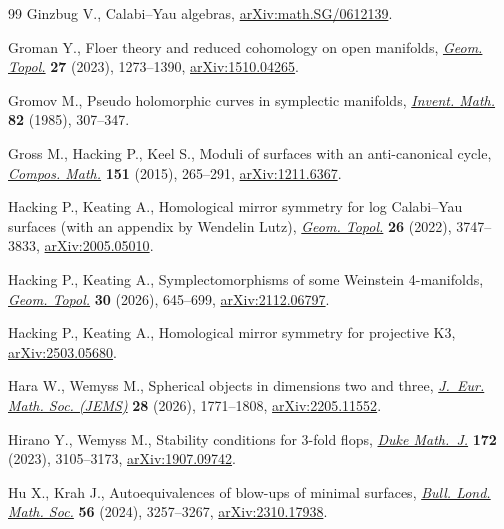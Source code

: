 \documentclass[pdftex]{sigma}
\theoremstyle{definition}
\numberwithin{equation}{section}
\begin{document}
\begin{thebibliography}{99}
Ginzbug V., Calabi--{Y}au algebras,
 \href{http://arxiv.org/abs/math.SG/0612139}{arXiv:math.SG/0612139}.

Groman Y., Floer theory and reduced cohomology on open manifolds,
 \href{https://doi.org/10.2140/gt.2023.27.1273}{\textit{Geom. Topol.}}
 \textbf{27} (2023), 1273--1390,
 \href{http://arxiv.org/abs/1510.04265}{arXiv:1510.04265}.

Gromov M., Pseudo holomorphic curves in symplectic manifolds,
 \href{https://doi.org/10.1007/BF01388806}{\textit{Invent. Math.}} \textbf{82}
 (1985), 307--347.

Gross M., Hacking P., Keel S., Moduli of surfaces with an anti-canonical cycle,
 \href{https://doi.org/10.1112/S0010437X14007611}{\textit{Compos. Math.}}
 \textbf{151} (2015), 265--291,
 \href{http://arxiv.org/abs/1211.6367}{arXiv:1211.6367}.

Hacking P., Keating A., Homological mirror symmetry for log {C}alabi--{Y}au
 surfaces (with an appendix by {W}endelin {L}utz),
 \href{https://doi.org/10.2140/gt.2022.26.3747}{\textit{Geom. Topol.}}
 \textbf{26} (2022), 3747--3833,
 \href{http://arxiv.org/abs/2005.05010}{arXiv:2005.05010}.

Hacking P., Keating A., Symplectomorphisms of some {W}einstein 4-manifolds,
 \href{https://doi.org/10.2140/gt.2026.30.645}{\textit{Geom. Topol.}}
 \textbf{30} (2026), 645--699,
 \href{http://arxiv.org/abs/2112.06797}{arXiv:2112.06797}.

Hacking P., Keating A., Homological mirror symmetry for projective {K}3,
 \href{http://arxiv.org/abs/2503.05680}{arXiv:2503.05680}.

Hara W., Wemyss M., Spherical objects in dimensions two and three,
 \href{https://doi.org/10.4171/jems/1504}{\textit{J.~Eur. Math. Soc. (JEMS)}}
 \textbf{28} (2026), 1771--1808,
 \href{http://arxiv.org/abs/2205.11552}{arXiv:2205.11552}.

Hirano Y., Wemyss M., Stability conditions for 3-fold flops,
 \href{https://doi.org/10.1215/00127094-2022-0097}{\textit{Duke Math.~J.}}
 \textbf{172} (2023), 3105--3173,
 \href{http://arxiv.org/abs/1907.09742}{arXiv:1907.09742}.

Hu X., Krah J., Autoequivalences of blow-ups of minimal surfaces,
 \href{https://doi.org/10.1112/blms.13131}{\textit{Bull. Lond. Math. Soc.}}
 \textbf{56} (2024), 3257--3267,
 \href{http://arxiv.org/abs/2310.17938}{arXiv:2310.17938}.


\end{thebibliography}
\end{document}
